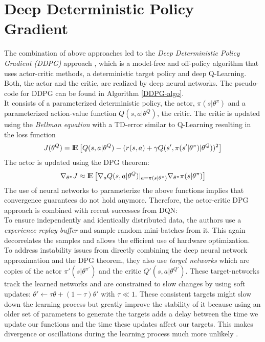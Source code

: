 \section{Deep Deterministic Policy Gradient}
\label{sec:DDPG}
The combination of above approaches led to the \textit{Deep Deterministic Policy Gradient (DDPG)} approach \citep{lillicrap2015continuous}, which is a model-free and off-policy algorithm that uses actor-critic methods, a deterministic target policy and deep Q-Learning. Both, the actor and the critic, are realized by deep neural networks. The pseudo-code for DDPG can be found in Algorithm \ref{DDPG-algo}.\\
It consists of a parameterized deterministic policy, the actor, $\pi(s|\theta^\pi)$ and a parameterized action-value function $Q(s,a|\theta^Q)$, the critic. The critic is updated using the \textit{Bellman equation} with a TD-error similar to Q-Learning \citep{watkins1992q} resulting in the loss function
\[
J(\theta^Q)={\rm I\!E}\left[
Q(s,a|\theta^Q)-(r(s,a) + \gamma Q(s', \pi(s'|\theta^\pi)|\theta^{Q}))^2\right]
\]
The actor is updated using the DPG theorem:
\[
\nabla_{\theta^\pi}J\approx {\rm I\!E}\left[\nabla_aQ(s,a|\theta^Q)|_{a=\pi(s|\theta^\pi)} \nabla_{\theta^\pi}\pi(s|\theta^\pi)\right]
\]
The use of neural networks to parameterize the above functions implies that convergence guarantees do not hold anymore. Therefore, the actor-critic DPG approach is combined with recent successes from DQN:\\
To ensure independently and identically distributed data, the authors use a \textit{experience replay buffer} and sample random mini-batches from it. This again decorrelates the samples and allows the efficient use of hardware optimization.\\
To address instability issues from directly combining the deep neural network approximation and the DPG theorem, they also use \textit{target networks} which are copies of the actor $\pi'(s|\theta^{\pi'})$ and the critic $Q'(s,a|\theta^{Q'})$. These target-networks track the learned networks and are constrained to slow changes by using soft updates: $\theta' \leftarrow \tau\theta + (1-\tau)\theta'$ with $\tau \ll 1$. These consistent targets might slow down the learning process but greatly improve the stability of it because using an older set of parameters to generate the targets adds a delay between the time we update our functions and the time these updates affect our targets. This makes divergence or oscillations during the learning process much more unlikely \citep{mnih2015human}.\\
